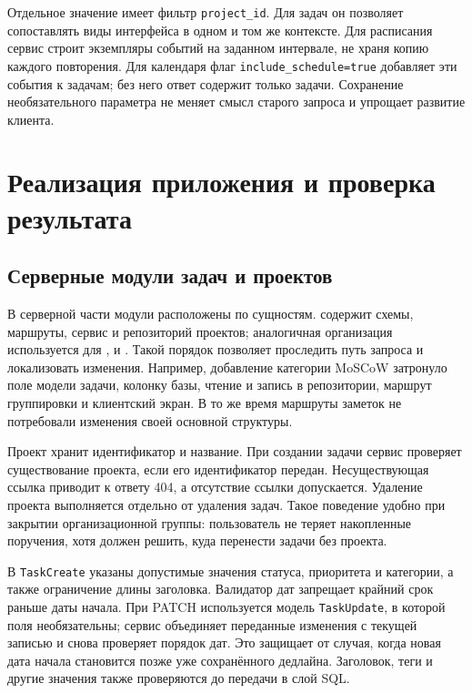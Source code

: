\documentclass[14pt,a4paper]{extarticle}
\begin{document}
Отдельное значение имеет фильтр \texttt{project\_id}. Для задач он позволяет сопоставлять виды интерфейса в одном и том же контексте. Для расписания сервис строит экземпляры событий на заданном интервале, не храня копию каждого повторения. Для календаря флаг \texttt{include\_schedule=true} добавляет эти события к задачам; без него ответ содержит только задачи. Сохранение необязательного параметра не меняет смысл старого запроса и упрощает развитие клиента.

\section{Реализация приложения и проверка результата}

\subsection{Серверные модули задач и проектов}

В серверной части модули расположены по сущностям.  содержит схемы, маршруты, сервис и репозиторий проектов; аналогичная организация используется для ,  и . Такой порядок позволяет проследить путь запроса и локализовать изменения. Например, добавление категории MoSCoW затронуло поле модели задачи, колонку базы, чтение и запись в репозитории, маршрут группировки и клиентский экран. В то же время маршруты заметок не потребовали изменения своей основной структуры.

Проект хранит идентификатор и название. При создании задачи сервис проверяет существование проекта, если его идентификатор передан. Несуществующая ссылка приводит к ответу 404, а отсутствие ссылки допускается. Удаление проекта выполняется отдельно от удаления задач. Такое поведение удобно при закрытии организационной группы: пользователь не теряет накопленные поручения, хотя должен решить, куда перенести задачи без проекта.

В \texttt{TaskCreate} указаны допустимые значения статуса, приоритета и категории, а также ограничение длины заголовка. Валидатор дат запрещает крайний срок раньше даты начала. При PATCH используется модель \texttt{TaskUpdate}, в которой поля необязательны; сервис объединяет переданные изменения с текущей записью и снова проверяет порядок дат. Это защищает от случая, когда новая дата начала становится позже уже сохранённого дедлайна. Заголовок, теги и другие значения также проверяются до передачи в слой SQL.
\end{document}
